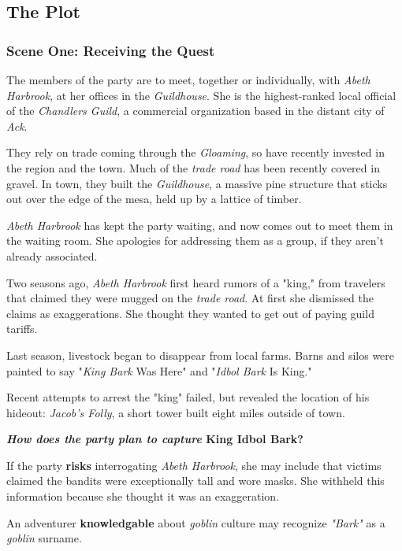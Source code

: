 \documentclass[11pt]{teraum_adventure}
\begin{document}
\subsection*{The Plot}
\label{sec:orgce0ca4e}
\subsubsection*{Scene One: Receiving the Quest}
\label{sec:org1801121}
The members of the party are to meet, together or individually, with
\emph{Abeth Harbrook}, at her offices in the \emph{Guildhouse}. She is the
highest-ranked local official of the \emph{Chandlers Guild}, a commercial
organization based in the distant city of \emph{Ack}.

They rely on trade coming through the \emph{Gloaming}, so have recently
invested in the region and the town. Much of the \emph{trade road} has been
recently covered in gravel. In town, they built the \emph{Guildhouse}, a
massive pine structure that sticks out over the edge of the mesa, held
up by a lattice of timber.

\emph{Abeth Harbrook} has kept the party waiting, and now comes out to meet
them in the waiting room. She apologies for addressing them as a
group, if they aren't already associated.

Two seasons ago, \emph{Abeth Harbrook} first heard rumors of a "king," from
travelers that claimed they were mugged on the \emph{trade road}. At first
she dismissed the claims as exaggerations. She thought they wanted to
get out of paying guild tariffs.

Last season, livestock began to disappear from local farms. Barns and
silos were painted to say "\emph{King Bark} Was Here" and "\emph{Idbol Bark} Is
King."

Recent attempts to arrest the "king" failed, but revealed the location
of his hideout: \emph{Jacob's Folly}, a short tower built eight miles
outside of town.

\textbf{\emph{How does the party plan to capture} King Idbol Bark?}

If the party \textbf{risks} interrogating \emph{Abeth Harbrook}, she may include
that victims claimed the bandits were exceptionally tall and wore
masks. She withheld this information because she thought it was an
exaggeration.

An adventurer \textbf{knowledgable} about \emph{goblin} culture may recognize
\emph{"Bark"} as a \emph{goblin} surname.
\end{document}
